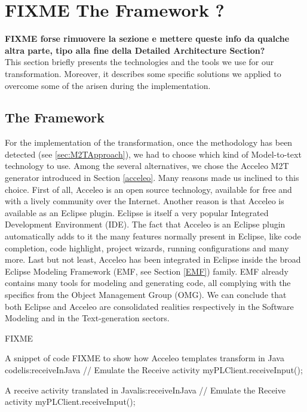 \section{FIXME The Framework ? }
\label{sec:TheFramework}
\textbf{FIXME forse rimuovere la sezione e mettere queste info da qualche altra parte, tipo alla fine della Detailed Architecture Section?} \\
This section briefly presents the technologies and the tools we use for our transformation. Moreover, it describes some specific solutions we applied to overcome some of the arisen during the implementation.

\subsection{The Framework}
\label{framework}
For the implementation of the transformation, once the methodology has been detected (see \ref{sec:M2TApproach}), we had to choose which kind of Model-to-text technology to use. Among the several alternatives, we chose the Acceleo M2T generator introduced in Section \ref{acceleo}.
Many reasons made us inclined to this choice. 
First of all, Acceleo is an open source technology, available for free and with a lively community over the Internet. Another reason is that Acceleo is available as an Eclipse plugin. Eclipse is itself a very popular Integrated Development Environment (IDE). The fact that Acceleo is an Eclipse plugin automatically adds to it the many features normally present in Eclipse, like code completion, code highlight, project wizards, running configurations and many more. 
Last but not least, Acceleo has been integrated in Eclipse inside the broad Eclipse Modeling Framework (EMF, see Section \ref{EMF}) family. EMF already contains many tools for modeling and generating code, all complying with the specifics from the Object Management Group (OMG).
We can conclude that both Eclipse and Acceleo are consolidated realities respectively in the Software Modeling and in the Text-generation sectors. 


FIXME
\begin{center}
\begin{minipage}{.5\textwidth}
  \begin{java-code}{A snippet of code FIXME to show how Acceleo templates transform in Java code}{lis:receiveInJava}
// Emulate the Receive activity		
		myPLClient.receiveInput();	
\end{java-code}
\end{minipage}
\hfill
\begin{minipage}{.49\textwidth}
  \begin{java-code}{A receive activity translated in Java}{lis:receiveInJava}
// Emulate the Receive activity		
		myPLClient.receiveInput();	
\end{java-code}
\end{minipage}
\end{center}